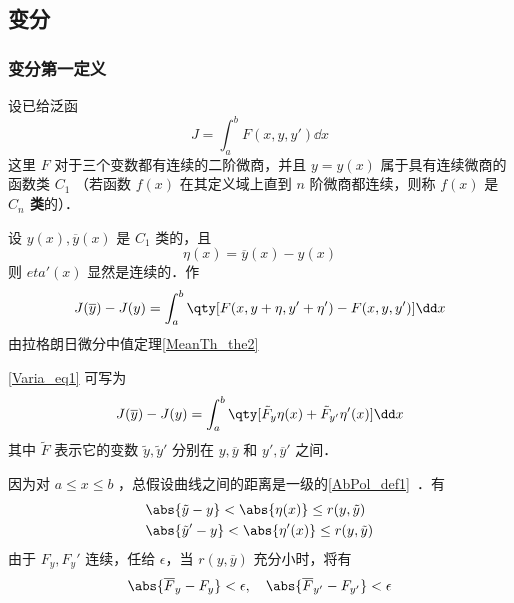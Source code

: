 \subsection{变分}
\subsubsection{变分第一定义}
设已给泛函
\begin{equation}
J=\int_a^b F(x,y,y')\dd x
\end{equation}
这里 $F$ 对于三个变数都有连续的二阶微商，并且 $y=y(x)$ 属于具有连续微商的函数类 $C_1$ （若函数 $f(x)$ 在其定义域上直到 $n$ 阶微商都连续，则称 $f(x)$ 是\textbf{ $C_n$ 类}的）．

设 $y(x),\overline{y}(x)$ 是 $C_1$ 类的，且
\begin{equation}
\eta(x)=\overline{y}(x)-y(x)
\end{equation}
则 $eta'(x)$ 显然是连续的．作
\begin{equation}\label{Varia_eq1}
J(\overline{y})-J(y)=\int_a^b\qty[F(x,y+\eta,y'+\eta')-F(x,y,y')]\dd x
\end{equation}
由拉格朗日微分中值定理\autoref{MeanTh_the2}~
\begin{issues}
\end{issues}
\autoref{Varia_eq1} 可写为
\begin{equation}
J(\overline{y})-J(y)=\int_a^b\qty[\tilde{F}_y\eta(x)+\tilde{F}_{y'}\eta'(x)]\dd x
\end{equation}
其中 $\tilde{F}$ 表示它的变数 $\tilde{y},\tilde{y}'$ 分别在 $y,\overline{y}$ 和 $y',\overline{y}'$ 之间．

因为对 $a\leq x\leq b$ ，总假设曲线之间的距离是一级的\autoref{AbPol_def1}~．有
\begin{equation}
\begin{aligned}
&\abs{\tilde{y}-y}<\abs{\eta(x)}\leq r(y,\tilde{y})\\
&\abs{\tilde{y}'-y}<\abs{\eta'(x)}\leq r(y,\tilde{y})
\end{aligned}
\end{equation}
由于 $F_y,F_y'$ 连续，任给 $\epsilon$，当 $r(y,\overline{y})$ 充分小时，将有
\begin{equation}
\abs{\overline{F}_y-F_y}<\epsilon,\quad\abs{\overline{F}_{y'}-F_{y'}}<\epsilon
\end{equation}
